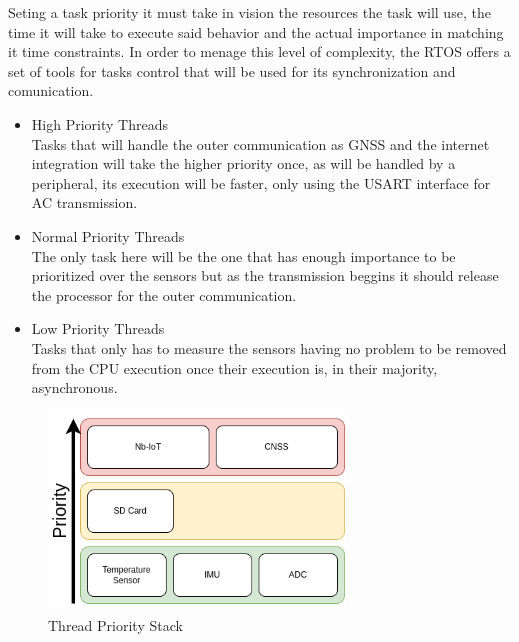 Seting a task priority it must take in vision the resources the task will use, the time it will take to execute said behavior
and the actual importance in matching it time constraints. In order to menage this level of complexity, the RTOS offers a set of
tools for tasks control that will be used for its synchronization and comunication.
\begin{itemize}
    \item High Priority Threads \\ 
    Tasks that will handle the outer communication as GNSS and the internet integration will take the higher priority once, as will be handled
    by a peripheral, its execution will be faster, only using the USART interface for AC transmission. 
    \item Normal Priority Threads \\
    The only task here will be the one that has enough importance to be prioritized over the sensors but as the transmission beggins it should release the processor
    for the outer communication.
    \item Low Priority Threads \\
    Tasks that only has to measure the sensors having no problem to be removed from the CPU execution
    once their execution is, in their majority, asynchronous.
    
\end{itemize}

\begin{figure}[H]
    \centering
    \includegraphics[width=0.7\textwidth]{images/diagrams/threads/thread.drawio.png}  %
    \caption{Thread Priority Stack}
    \label{fig:Thread Priority Stack}        
\end{figure}


